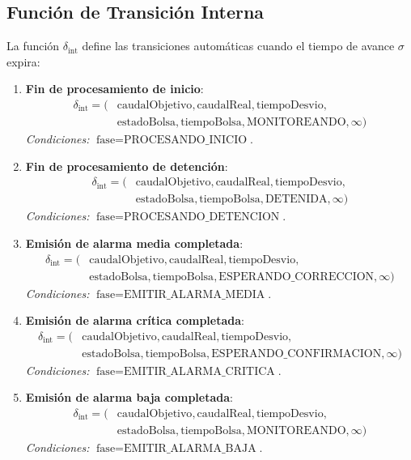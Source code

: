 \documentclass[12pt,a4paper,oneside]{report}
\begin{document}
\subsection{Función de Transición Interna}

La función $\delta_{\text{int}}$ define las transiciones automáticas cuando el tiempo de avance $\sigma$ expira:

\begin{enumerate}
    \item \textbf{Fin de procesamiento de inicio}:
    \[
    \begin{aligned}
    \delta_{\text{int}} = (&\text{caudalObjetivo},
    \text{caudalReal},
    \text{tiempoDesvio},\\
    &\text{estadoBolsa},
    \text{tiempoBolsa},
    \text{MONITOREANDO},
    \infty)
    \end{aligned}
    \]
    \textit{Condiciones:} $\text{fase} = \text{PROCESANDO\_INICIO}$.
    
    \item \textbf{Fin de procesamiento de detención}:
    \[
    \begin{aligned}
    \delta_{\text{int}} = (&\text{caudalObjetivo},
    \text{caudalReal},
    \text{tiempoDesvio},\\
    &\text{estadoBolsa},
    \text{tiempoBolsa},
    \text{DETENIDA},
    \infty)
    \end{aligned}
    \]
    \textit{Condiciones:} $\text{fase} = \text{PROCESANDO\_DETENCION}$.
    
    \item \textbf{Emisión de alarma media completada}:
    \[
    \begin{aligned}
    \delta_{\text{int}} = (&\text{caudalObjetivo},
    \text{caudalReal},
    \text{tiempoDesvio},\\
    &\text{estadoBolsa},
    \text{tiempoBolsa},
    \text{ESPERANDO\_CORRECCION},
    \infty)
    \end{aligned}
    \]
    \textit{Condiciones:} $\text{fase} = \text{EMITIR\_ALARMA\_MEDIA}$.
    
    \item \textbf{Emisión de alarma crítica completada}:
    \[
    \begin{aligned}
    \delta_{\text{int}} = (&\text{caudalObjetivo},
    \text{caudalReal},
    \text{tiempoDesvio},\\
    &\text{estadoBolsa},
    \text{tiempoBolsa},
    \text{ESPERANDO\_CONFIRMACION},
    \infty)
    \end{aligned}
    \]
    \textit{Condiciones:} $\text{fase} = \text{EMITIR\_ALARMA\_CRITICA}$.
    
    \item \textbf{Emisión de alarma baja completada}:
    \[
    \begin{aligned}
    \delta_{\text{int}} = (&\text{caudalObjetivo},
    \text{caudalReal},
    \text{tiempoDesvio},\\
    &\text{estadoBolsa},
    \text{tiempoBolsa},
    \text{MONITOREANDO},
    \infty)
    \end{aligned}
    \]
    \textit{Condiciones:} $\text{fase} = \text{EMITIR\_ALARMA\_BAJA}$.
\end{enumerate}
\end{document}
